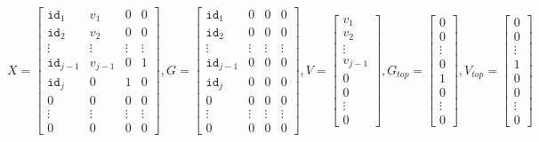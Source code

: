     \[
    X = \begin{bmatrix}
        \texttt{id}_1 & v_1 & 0 & 0 \\
        \texttt{id}_2 & v_2 & 0 & 0 \\
        \vdots & \vdots & \vdots & \vdots \\
        \texttt{id}_{j-1} & v_{j-1} & 0 & 1 \\
        \texttt{id}_j & 0 & 1 & 0 \\
        0 & 0 & 0 & 0 \\
        \vdots & \vdots & \vdots & \vdots \\
        0 & 0 & 0 & 0
    \end{bmatrix}, 
    G = \begin{bmatrix}
        \texttt{id}_1 & 0 & 0 & 0 \\
        \texttt{id}_2 & 0 & 0 & 0\\
        \vdots & \vdots & \vdots & \vdots  \\
        \texttt{id}_{j-1} & 0 & 0 & 0\\
        \texttt{id}_j & 0 & 0 & 0\\
        0 & 0 & 0 & 0 \\
        \vdots & \vdots & \vdots & \vdots \\
        0 & 0 & 0 & 0
    \end{bmatrix}, 
    V = \begin{bmatrix}
        v_1  \\
        v_2 \\
        \vdots   \\
        v_{j-1} \\
        0 \\
        0 \\
        \vdots \\
        0 
    \end{bmatrix}, 
    G_{top} = \begin{bmatrix}
        0  \\
        0 \\
        \vdots   \\
        0 \\
        1 \\
        0 \\
        \vdots \\
        0 
    \end{bmatrix}, 
    V_{top} = \begin{bmatrix}
        0  \\
        0 \\
        \vdots   \\
        1 \\
        0 \\
        0 \\
        \vdots \\
        0 
    \end{bmatrix}
    \]

